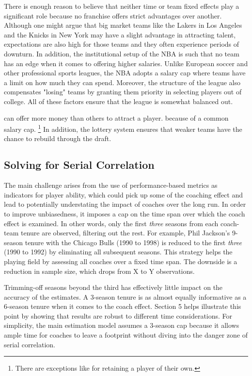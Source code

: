 There is enough reason to believe that neither time or team fixed effects play a significant role because no franchise offers strict advantages over another. Although one might argue that big market teams like the Lakers in Los Angeles and the Knicks in New York may have a slight advantage in attracting talent, expectations are also high for those teams and they often experience periods of downturn.  In addition, the institutional setup of the NBA is such that no team has an edge when it comes to offering higher salaries. Unlike European soccer and other professional sports leagues, the NBA adopts a salary cap where teams have a limit on how much they can spend. Moreover, the structure of the league also compensates "losing" teams by granting them priority in selecting players out of college. All of these factors ensure that the league is somewhat balanced out. 

can offer more money than others to attract a player. because of a common salary cap. \footnote{There are exceptions like for retaining a player of their own.} In addition, the lottery system ensures that weaker teams have the chance to rebuild through the draft. 

\subsection{Solving for Serial Correlation}

The main challenge arises from the use of performance-based metrics as indicators for player ability, which could pick up some of the coaching effect and lead to potentially understating the impact of coaches over the long run. In order to improve unbiasedness, it imposes a cap on the time span over which the coach effect is examined. In other words, only the first \textit{three} seasons from each coach-team tenure are observed, filtering out the rest. For example, Phil Jackson's 9-season tenure with the Chicago Bulls (1990 to 1998) is reduced to the first \textit{three} (1990 to 1992) by eliminating all subsequent seasons. This strategy helps the playing field by assessing all coaches over a fixed time span. The downside is a reduction in sample size, which drops from X to Y observations.

Trimming-off seasons beyond the third has effectively little impact on the accuracy of the estimates. A 3-season tenure is as almost equally informative as a 6-season tenure when it comes to the coach effect. Section 5 helps illustrate this point by showing that results are robust to different time considerations. For simplicity, the main estimation model assumes a 3-season cap because it allows ample time for coaches to leave a footprint without diving into the danger zone of serial correlation.


